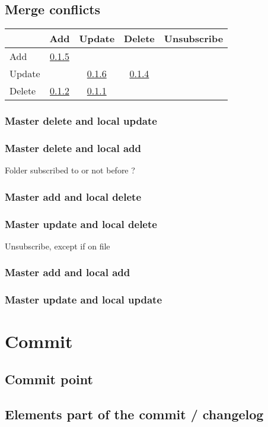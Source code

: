 \documentclass[10pt,a4paper]{article}
\begin{document}
\subsection{Merge conflicts}

\begin{tabular}{l|c c c c}
 & Add & Update & Delete & Unsubscribe \\
\hline
Add & \ref{addadd} &\\
Update & & \ref{updupd} & \ref{upddel} &\\
Delete & \ref{deladd} & \ref{delupd} & \\
\end{tabular}

\subsubsection{Master delete and local update}
\label{delupd}

\subsubsection{Master delete and local add}
\label{deladd}

Folder subscribed to or not before ?

\subsubsection{Master add and local delete}
\label{adddel}

\subsubsection{Master update and local delete}
\label{upddel}

Unsubscribe, except if on file

\subsubsection{Master add and local add}
\label{addadd}

\subsubsection{Master update and local update}
\label{updupd}

\section{Commit}

\subsection{Commit point}

\subsection{Elements part of the commit / changelog}
\end{document}
